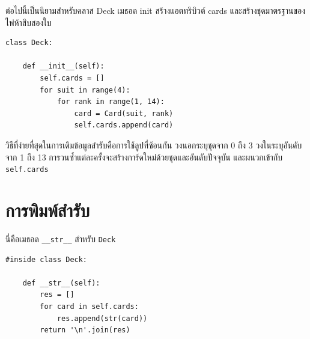 ต่อไปนี้เป็นนิยามสำหรับคลาส Deck เมธอด init สร้างแอตทริบิวต์ cards และสร้างชุดมาตรฐานของไพ่ห้าสิบสองใบ


\begin{verbatim}
class Deck:

    def __init__(self):
        self.cards = []
        for suit in range(4):
            for rank in range(1, 14):
                card = Card(suit, rank)
                self.cards.append(card)
\end{verbatim}
%
วิธีที่ง่ายที่สุดในการเติมข้อมูลสำรับคือการใช้ลูปที่ซ้อนกัน วงนอกระบุชุดจาก 0 ถึง 3 วงในระบุอันดับจาก 1 ถึง 13 การวนซ้ำแต่ละครั้งจะสร้างการ์ดใหม่ด้วยชุดและอันดับปัจจุบัน และผนวกเข้ากับ {\tt self.cards}


\section{การพิมพ์สำรับ} %
\label{printdeck}

นี่คือเมธอด \verb"__str__" สำหรับ {\tt Deck}

\begin{verbatim}
#inside class Deck:

    def __str__(self):
        res = []
        for card in self.cards:
            res.append(str(card))
        return '\n'.join(res)
\end{verbatim}
%

